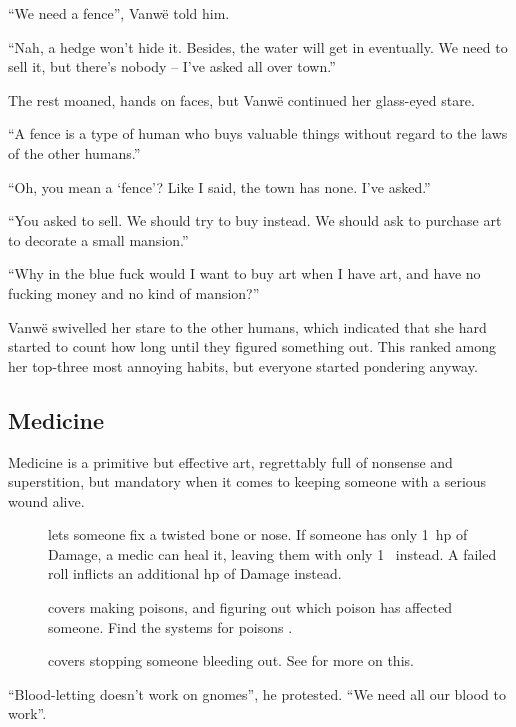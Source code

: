 \begin{multicols}{2}
\begin{exampletext}
  ``We need a fence'', Vanw\"e told him.

  ``Nah, a hedge won't hide it.
  Besides, the water will get in eventually.
  We need to sell it, but there's nobody -- I've asked all over town.''

  The rest moaned, hands on faces, but Vanw\"e continued her glass-eyed stare.

  ``A fence is a type of human who buys valuable things without regard to the laws of the other humans.''

  ``Oh, you mean a `fence'?
  Like I said, the town has none.
  I've asked.''

  ``You asked to sell.
  We should try to buy instead.
  We should ask to purchase art to decorate a small mansion.''

  ``Why in the blue fuck would I want to buy art when I have art, and have no fucking money and no kind of mansion?''

  Vanw\"e swivelled her stare to the other humans, which indicated that she hard started to count how long until they figured something out.
  This ranked among her top-three most annoying habits, but everyone started pondering anyway.
\end{exampletext}

\subsection{Medicine}

Medicine is a primitive but effective art, regrettably full of nonsense and superstition, but mandatory when it comes to keeping someone with a serious wound alive.

\begin{description}
  \item[]
    lets someone fix a twisted bone or nose.
    If someone has only 1~\gls{hp} of Damage, a medic can heal it, leaving them with only 1~ instead.
    A failed roll inflicts an additional \gls{hp} of Damage instead.
  \item[]
    covers making poisons, and figuring out which poison has affected someone.
    Find the systems for poisons .
  \item[]
    covers stopping someone bleeding out.
    See  for more on this.
\end{description}

\begin{exampletext}
  ``Blood-letting doesn't work on gnomes'', he protested.
  ``We need all our blood to work''.


\end{exampletext}
\end{multicols}
